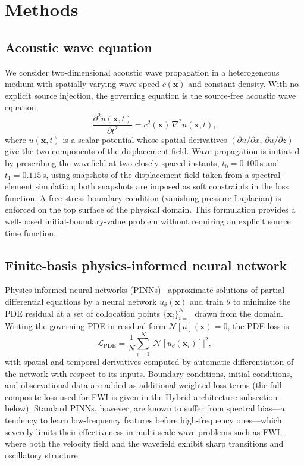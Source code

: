 \section{Methods}\label{sec:method}

\subsection{Acoustic wave equation}
\label{sec:methods_wave}

We consider two-dimensional acoustic wave propagation in a heterogeneous medium with spatially varying wave speed $c(\mathbf{x})$ and constant density. With no explicit source injection, the governing equation is the source-free acoustic wave equation,
\begin{equation}
\frac{\partial^{2} u(\mathbf{x},t)}{\partial t^{2}}
= c^{2}(\mathbf{x})\,\nabla^{2} u(\mathbf{x},t),
\label{eq:acoustic_wave}
\end{equation}
where $u(\mathbf{x},t)$ is a scalar potential whose spatial derivatives $(\partial u/\partial x,\, \partial u/\partial z)$ give the two components of the displacement field. Wave propagation is initiated by prescribing the wavefield at two closely-spaced instants, $t_0 = 0.100$\,s and $t_1 = 0.115$\,s, using snapshots of the displacement field taken from a spectral-element simulation; both snapshots are imposed as soft constraints in the loss function. A free-stress boundary condition (vanishing pressure Laplacian) is enforced on the top surface of the physical domain. This formulation provides a well-posed initial-boundary-value problem without requiring an explicit source time function.





\subsection{Finite-basis physics-informed neural network}
\label{sec:methods_fbpinn}

Physics-informed neural networks (PINNs)~\cite{RAISSI2019686} approximate solutions of partial differential equations by a neural network $u_\theta(\mathbf{x})$ and train $\theta$ to minimize the PDE residual at a set of collocation points $\{\mathbf{x}_i\}_{i=1}^{N}$ drawn from the domain. Writing the governing PDE in residual form $\mathcal{N}[u](\mathbf{x}) = 0$, the PDE loss is
\begin{equation}
    \mathcal{L}_\text{PDE}
    = \frac{1}{N} \sum_{i=1}^{N}
    \left| \mathcal{N}[u_\theta(\mathbf{x}_i)] \right|^{2},
\end{equation}
with spatial and temporal derivatives computed by automatic differentiation of the network with respect to its inputs. Boundary conditions, initial conditions, and observational data are added as additional weighted loss terms (the full composite loss used for FWI is given in the Hybrid architecture subsection below). Standard PINNs, however, are known to suffer from spectral bias---a tendency to learn low-frequency features before high-frequency ones---which severely limits their effectiveness in multi-scale wave problems such as FWI, where both the velocity field and the wavefield exhibit sharp transitions and oscillatory structure.

